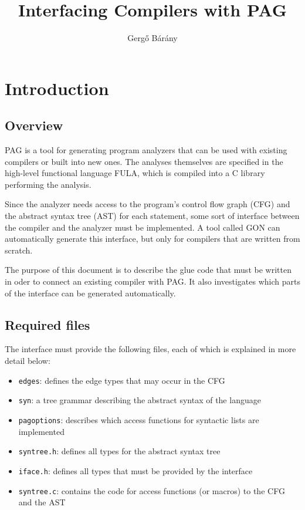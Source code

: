 \documentclass[12pt]{article}
\title{Interfacing Compilers with PAG}
\author{Gerg\H{o} B\'ar\'any}
\begin{document}
\maketitle

\section{Introduction}
\subsection{Overview}

PAG is a tool for generating program analyzers that can be used with
existing compilers or built into new ones. The analyses themselves
are specified in the high-level functional language FULA, which is
compiled into a C library performing the analysis.

Since the analyzer needs access to the program's control flow graph
(CFG) and the abstract syntax tree (AST) for each statement, some
sort of interface between the compiler and the analyzer must be
implemented. A tool called GON can automatically generate this
interface, but only for compilers that are written from scratch.

The purpose of this document is to describe the glue code that must
be written in oder to connect an existing compiler with PAG. It also
investigates which parts of the interface can be generated
automatically.

\subsection{Required files}

The interface must provide the following files, each of which is
explained in more detail below:
\begin{itemize}
\item \verb|edges|: defines the edge types that may occur in the CFG
\item \verb|syn|: a tree grammar describing the abstract syntax of
the language
\item \verb|pagoptions|: describes which access functions for
syntactic lists are implemented
\item \verb|syntree.h|: defines all types for the abstract syntax
tree
\item \verb|iface.h|: defines all types that must be provided by the
interface
\item \verb|syntree.c|: contains the code for access functions (or
macros) to the CFG and the AST
\end{itemize}
\end{document}
